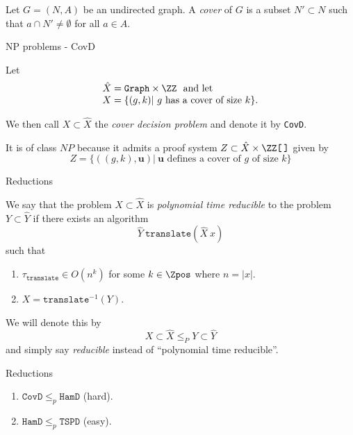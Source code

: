 \begin{frame}
	\begin{defn}
		Let $G= (N, A)$ be an undirected graph. A \emph{cover} of $G$ is a
		subset $N' \subset N$ such that $a \cap N' \neq \emptyset$ for all
		$a \in A$.
	\end{defn}
\end{frame}

\begin{frame}{NP problems - CovD}
	\begin{defn}
		Let
		\[
			\begin{array}{l}
				\hat{X}= \mathtt{Graph} \times \ZZ\ \mbox{ and let}\\
				X=
				\{
					(g, k) |\ \mbox{$g$ has a cover of size $k$}
				\}. 
			\end{array}
		\]

		We then call
		\(
			X \subset \hat{X}
		\)
		the \emph{cover decision problem} and denote it by \texttt{CovD}.
	\end{defn}

	\bigskip
	It is of class $NP$ because it admits a proof system
	\(
		Z \subset \hat{X} \times \ZZ\texttt{[\,]}
	\)
	given by
	\[
		Z=
		\{
			((g,k), \mathbf{u}) |\ 
			\mbox{$\mathbf{u}$ defines a cover of $g$ of size $k$}
		\}
	\]
\end{frame}

\begin{frame}{Reductions}
	\begin{defn}
		We say that the problem
		\(
			X \subset \hat{X}
		\)
		is \emph{polynomial time reducible} to the problem
		\(
			Y \subset \hat{Y}
		\)
		if there exists an algorithm
		\[
			\hat{Y} \ \mathtt{translate}(\hat{X} \ x)
		\]
		such that
		\begin{enumerate}
			\item
				\(
					\tau_{\mathtt{translate}} \in O(n^k)
				\)
				for some $k \in \Zpos$ where $n= |x|$.
			\item
				\(
					X = \mathtt{translate}^{-1}(Y).
				\)	  
		\end{enumerate}

		We will denote this by
		\[
			X \subset \hat{X} \leq_P Y \subset \hat{Y}
		\]
		and simply say \emph{reducible} instead of ``polynomial time reducible''.
	\end{defn}
\end{frame}

\begin{frame}{Reductions}
	\begin{thm}
		\begin{enumerate}
			\item 
				\(
					\mathtt{CovD} \leq_p \mathtt{HamD}
				\) (hard). \pause
			\item 
				\(
					\mathtt{HamD} \leq_p \mathtt{TSPD}
				\) (easy).
		\end{enumerate}
	\end{thm}
\end{frame}


